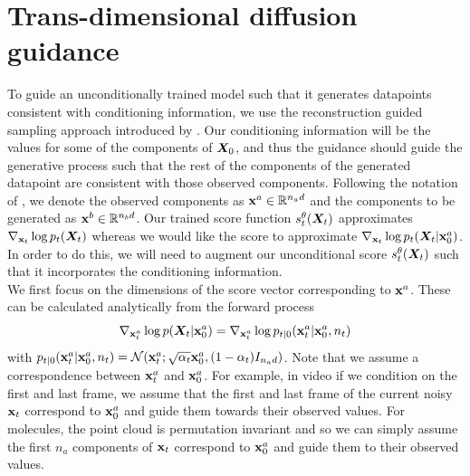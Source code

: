 \section{Trans-dimensional diffusion guidance}
\label{sec:tddm-ApdxDiffGuide}

To guide an unconditionally trained model such that it generates datapoints consistent with conditioning information, we use the reconstruction guided sampling approach introduced by \citet{ho2022video}. Our conditioning information will be the values for some of the components of ${\bm{X}}_0$, and thus the guidance should guide the generative process such that the rest of the components of the generated datapoint are consistent with those observed components. Following the notation of \citet{ho2022video}, we denote the observed components as ${\mathbf{x}}^a \in \mathbb{R}^{n_a d}$ and the components to be generated as ${\mathbf{x}}^b \in \mathbb{R}^{n_b d}$. Our trained score function $s_t^\theta({\bm{X}}_t)$ approximates $\nabla_{{\mathbf{x}}_t} \log p_t({\bm{X}}_t)$ whereas we would like the score to approximate $\nabla_{{\mathbf{x}}_t} \log p_t({\bm{X}}_t | {\mathbf{x}}_0^a)$. In order to do this, we will need to augment our unconditional score $s_t^\theta({\bm{X}}_t)$ such that it incorporates the conditioning information.\\

We first focus on the dimensions of the score vector corresponding to ${\mathbf{x}}^a$. These can be calculated analytically from the forward process
\begin{equation}
    \nabla_{{\mathbf{x}}_t^a} \log p({\bm{X}}_t | {\mathbf{x}}_0^a) = \nabla_{{\mathbf{x}}_t^a} \log p_{t|0}({\mathbf{x}}_t^a | {\mathbf{x}}_0^a, n_t)
\end{equation}
with $p_{t|0}({\mathbf{x}}_t^a | {\mathbf{x}}_0^a, n_t) = \mathcal{N}({\mathbf{x}}_t^a; \sqrt{\alpha_t} {\mathbf{x}}_0^a, (1 - \alpha_t) I_{n_a d})$. Note that we assume a correspondence between ${\mathbf{x}}_t^a$ and ${\mathbf{x}}_0^a$. For example, in video if we condition on the first and last frame, we assume that the first and last frame of the current noisy ${\mathbf{x}}_t$ correspond to ${\mathbf{x}}_0^a$ and guide them towards their observed values. For molecules, the point cloud is permutation invariant and so we can simply assume the first $n_a$ components of ${\mathbf{x}}_t$ correspond to ${\mathbf{x}}_0^a$ and guide them to their observed values.\\

